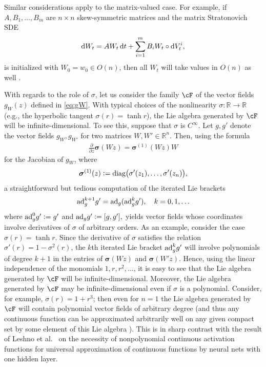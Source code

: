 \documentclass[letterpaper, 10pt, conference]{ieeeconf}
\def\Reals{{\mathbb R}}
\def\deq{:=}
\begin{document}
Similar considerations apply to the matrix-valued case. For example, if $A,B_1,\dots,B_m$ are $n \times n$ skew-symmetric matrices and the matrix Stratonovich SDE
\begin{align}\label{eq:Brockett_SDE_2}
	\dif W_t = AW_t \dif t + \sum^m_{i=1}B_i W_t \circ \dif V^i_t,
\end{align}
is initialized with $W_0 = w_0 \in O(n)$, then all $W_t$ will take values in $O(n)$ as well \cite{Brockett_spheres}. 

With regards to the role of $\sigma$, let us consider the family $\cF$ of the vector fields $g_W(z)$ defined in \eqref{eq:gW}. With typical choices of the nonlinearity $\sigma : \Reals \to \Reals$ (e.g., the hyperbolic tangent $\sigma(r) = \tanh r$), the Lie algebra generated by $\cF$ will be infinite-dimensional. To see this, suppose that $\sigma$ is $C^\infty$. Let $g,g'$ denote the vector fields $g_W,g_{W'}$ for two matrices $W,W' \in \Reals^n$. Then, using the formula
\begin{align*}
	\frac{\partial}{\partial z} \boldsymbol{\sigma}(Wz) = \boldsymbol{\sigma}^{(1)}(Wz)W
\end{align*}
for the Jacobian of $g_W$, where
$$
\boldsymbol{\sigma}^{(1)}(z) \deq {\rm diag}\big(\sigma'(z_1),\dots,\sigma'(z_n)\big), 
$$
a straightforward but tedious computation of the iterated Lie brackets
\begin{align*}
	{\rm ad}^{k+1}_g g' = {\rm ad}_g ({\rm ad}^{k}_g g'), \quad k = 0, 1, \dots
\end{align*}
where ${\rm ad}^0_g g' \deq g'$ and ${\rm ad}_g g' \deq [g,g'],$ yields vector fields whose coordinates involve derivatives of $\sigma$ of arbitrary orders. As an example, consider the case $\sigma(r) = \tanh r$. Since the derivative of $\sigma$ satisfies the relation $\sigma'(r) = 1-\sigma^2(r)$, the $k$th iterated Lie bracket ${\rm ad}^k_g g'$ will involve polynomials of degree $k+1$ in the entries of $\boldsymbol{\sigma}(Wz)$ and $\boldsymbol{\sigma}(W'z)$. Hence, using the linear independence of the monomials $1,r,r^2,\dots$, it is easy to see that the Lie algebra generated by $\cF$ will be infinite-dimensional. Moreover, the Lie algebra generated by $\cF$ may be infinite-dimensional even if $\sigma$ is a polynomial. Consider, for example, $\sigma(r) = 1 + r^3$; then even for $n=1$ the Lie algebra generated by $\cF$ will contain polynomial vector fields of arbitrary degree (and thus any continuous function can be approximated arbitrarily well on any given compact set by some element of this Lie algebra \cite{Agrachev2022}). This is in sharp contrast with the result of Leshno et al.~\cite{Leshno_etal_NN} on the necessity of nonpolynomial continuous  activation functions for universal approximation of continuous functions by neural nets with one hidden layer.
\end{document}
